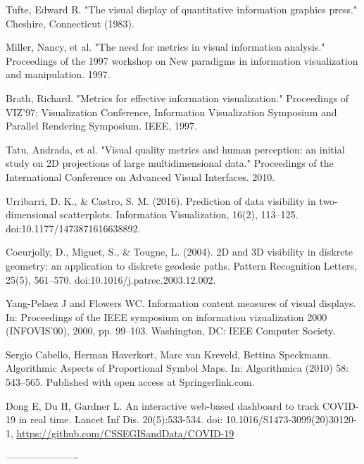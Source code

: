 \documentclass[a4paper,11pt]{article}
\begin{document}
\begin{thebibliography}{999}

  Tufte, Edward R. "The visual display of quantitative information graphics press." Cheshire, Connecticut (1983).

  Miller, Nancy, et al. "The need for metrics in visual information analysis." Proceedings of the 1997 workshop on New paradigms in information visualization and manipulation. 1997.

  Brath, Richard. "Metrics for effective information visualization." Proceedings of VIZ'97: Visualization Conference, Information Visualization Symposium and Parallel Rendering Symposium. IEEE, 1997.

  Tatu, Andrada, et al. "Visual quality metrics and human perception: an initial study on 2D projections of large multidimensional data." Proceedings of the International Conference on Advanced Visual Interfaces. 2010.

  Urribarri, D. K., \& Castro, S. M. (2016). Prediction of data visibility in two-dimensional scatterplots. Information Visualization, 16(2), 113–125. doi:10.1177/1473871616638892.

  Coeurjolly, D., Miguet, S., \& Tougne, L. (2004). 2D and 3D visibility in diskrete geometry: an application to diskrete geodesic paths. Pattern Recognition Letters, 25(5), 561–570. doi:10.1016/j.patrec.2003.12.002.

  Yang-Pelaez J and Flowers WC. Information content
  measures of visual displays. In: Proceedings of the IEEE symposium on information vizualization 2000 (INFOVIS’00), 2000, pp. 99–103. Washington, DC: IEEE Computer Society.

  Sergio Cabello, Herman Haverkort, Marc van Kreveld, Bettina Speckmann. Algorithmic Aspects of Proportional Symbol Maps. In: Algorithmica (2010) 58: 543–565. Published with open access at Springerlink.com.%

   Dong E, Du H, Gardner L. An interactive web-based dashboard to track COVID-19 in real time. Lancet Inf Dis. 20(5):533-534. doi: 10.1016/S1473-3099(20)30120-1, \url{https://github.com/CSSEGISandData/COVID-19}



\end{thebibliography}

----------------------
\end{document}
